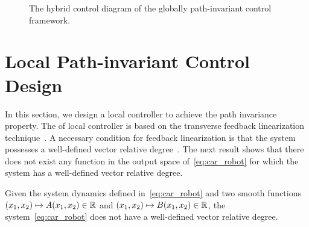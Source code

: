 \begin{figure*}[htbp]
    \centering
    \caption{The hybrid control diagram of the globally path-invariant control framework.}
    \label{fig:controldiagram}
    \vspace{-0.6cm}
\end{figure*}

\section{Local Path-invariant Control Design}\label{section:localcontrol}
\label{sec:path-invariant-control-design}
In this section, we design a local controller to achieve the path invariance property. The  of  local controller is based on the transverse feedback linearization technique~\cite{NieMag04,AkhNieWas2015}. 
A necessary condition for feedback linearization is that the system possesses a well-defined vector relative degree~\cite{Isi95}. The next result shows that there does not exist any function in the output space of~\eqref{eq:car_robot} for which the system has a well-defined vector relative degree. 
\begin{lemma}
\label{lemm:no-vector-relative-degree}
    Given the system dynamics defined in~\eqref{eq:car_robot} and  two smooth functions $(x_1,x_2)\mapsto A(x_1,x_2)\in\mathbb{R}$ and $(x_1,x_2)\mapsto B(x_1,x_2)\in\mathbb{R}$, the system~\eqref{eq:car_robot} does not have a well-defined vector relative degree. 
\end{lemma}

